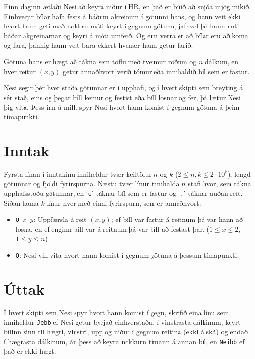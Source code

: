 
Einn daginn ætlaði Nesi að keyra niður í HR, en það er búið að snjóa mjög
mikið. Einhverjir bílar hafa fests á báðum akreinum í götunni hans, og hann
veit ekki hvort hann geti með nokkru móti keyrt í gegnum götuna, jafnvel þó
hann noti báðar akgreinarnar og keyri á móti umferð. Og enn verra er að bílar
eru að koma og fara, þannig hann veit bara ekkert hvenær hann getur farið.

Götuna hans er hægt að tákna sem töflu með tveimur röðum og $n$ dálkum, en
hver reitur $(x,y)$ getur annaðhvort verið tómur eða innihaldið bíl sem er fastur.

Nesi segir þér hver staða götunnar er í upphafi, og
í hvert skipti sem breyting á sér stað, eins og þegar bíll kemur og festist eða
bíll losnar og fer, þá lætur Nesi þig vita.
Þess inn á milli spyr Nesi hvort hann komist í gegnum götuna á þeim tímapunkti.

\section*{Inntak}
Fyrsta línan í inntakinu inniheldur tvær heiltölur $n$ og $k$ ($2\leq n, k \leq 2\cdot 10^5$), lengd götunnar og fjöldi fyrirspurna.
Næstu tvær línur innihalda $n$ stafi hvor, sem tákna upphafsstöðu götunnar, en `\texttt{o}' táknar bíl sem er fastur og `\texttt{.}' táknar auðan reit.
Síðan koma $k$ línur hver með einni fyrirspurn, sem er annaðhvort:
\begin{itemize}
    \item \texttt {U $x$ $y$}: Uppfærsla á reit $(x,y)$; ef bíll var fastur á reitnum þá var hann að losna,
        en ef enginn bíll var á reitnum þá var bíll að festast þar. ($1\leq x\leq 2$, $1\leq y \leq n$)
    \item \texttt {Q}: Nesi vill vita hvort hann komist í gegnum götuna á þessum tímapunkti.
\end{itemize}

\section*{Úttak}
Í hvert skipti sem Nesi spyr hvort hann komist í gegn, skrifið eina línu sem inniheldur
\texttt{Jebb} ef Nesi getur byrjað einhverstaðar í vinstrasta dálkinum, keyrt bílinn sinn til hægri, vinstri, upp og niður
í gegnum reitina (ekki á ská) og endað í hægrasta dálkinum, án þess að keyra nokkurn tímann á annan bíl,
en \texttt{Neibb} ef það er ekki hægt.

